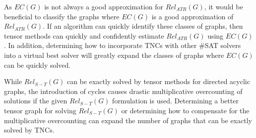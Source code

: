 \documentclass[12pt,twocolumn]{article}
\begin{document}
As \(EC(G)\) is not always a good approximation for \(Rel_{ATR}(G)\), it would be beneficial to classify the graphs where \(EC(G)\) is a good approximation of \(Rel_{ATR}(G)\). If an algorithm can quickly identify these classes of graphs, then tensor methods can quickly and confidently estimate \(Rel_{ATR}(G)\) using \(EC(G)\). In addition, determining how to incorporate TNCs with other \#SAT solvers into a virtual best solver will greatly expand the classes of graphs where \(EC(G)\) can be quickly solved.

While \(Rel_{S-T}(G)\) can be exactly solved by tensor methods for directed acyclic graphs, the introduction of cycles causes drastic multiplicative overcounting of solutions if the given \(Rel_{S-T}(G)\) formulation is used. Determining a better tensor graph for solving \(Rel_{S-T}(G)\) or determining how to compensate for the multiplicative overcounting can expand the number of graphs that can be exactly solved by TNCs.
\end{document}
